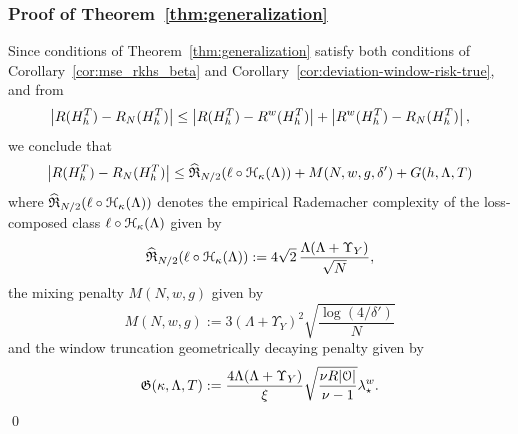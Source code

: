 \subsubsection{Proof of Theorem~\ref{thm:generalization}}\label{subsubsec:proof-thm-generalization}
Since conditions of Theorem~\ref{thm:generalization} satisfy both conditions of Corollary~\ref{cor:mse_rkhs_beta} and Corollary~\ref{cor:deviation-window-risk-true}, and from 
$$\left| R(H^T_h) - R_N(H^T_h) \right| \leq \left| R(H^T_h) - R^w(H^T_h) \right| + \left| R^w(H^T_h) - R_N(H^T_h) \right|,$$
we conclude that 
\begin{equation*}
    \left| R(H^T_h) - R_N(H^T_h) \right| \leq \widehat{\mathfrak{R}}_{N/2}(\ell \circ {\mathcal{H}}_{\kappa}(\Lambda)) + M(N,w,g, \delta') + G(h, \Lambda, T)
\end{equation*}
where $\widehat{\mathfrak{R}}_{N/2}(\ell \circ {\mathcal{H}}_{\kappa}(\Lambda))$ denotes the empirical Rademacher complexity of the loss-composed class $\ell \circ {\mathcal{H}}_{\kappa}(\Lambda)$ given by
$$\widehat{\mathfrak{R}}_{N/2}(\ell \circ {\mathcal{H}}_{\kappa}(\Lambda)) := 4\sqrt{2}\,\frac{\Lambda(\Lambda+\Upsilon_Y)}{\sqrt{N}},$$
 the mixing penalty $M(N,w,g)$ given by
$$ M(N, w, g) := 3(\Lambda+\Upsilon_Y)^2\sqrt{\frac{\log(4/\delta')}{N}}$$
and the window truncation geometrically decaying penalty given by
$$\mathfrak{G}(\kappa, \Lambda, T) := \frac{4 \Lambda (\Lambda + \Upsilon_Y)}{\xi} \sqrt{\frac{\nu R |{\mathcal{O}}|}{\nu - 1}} \lambda_\star^w.$$
\qed
